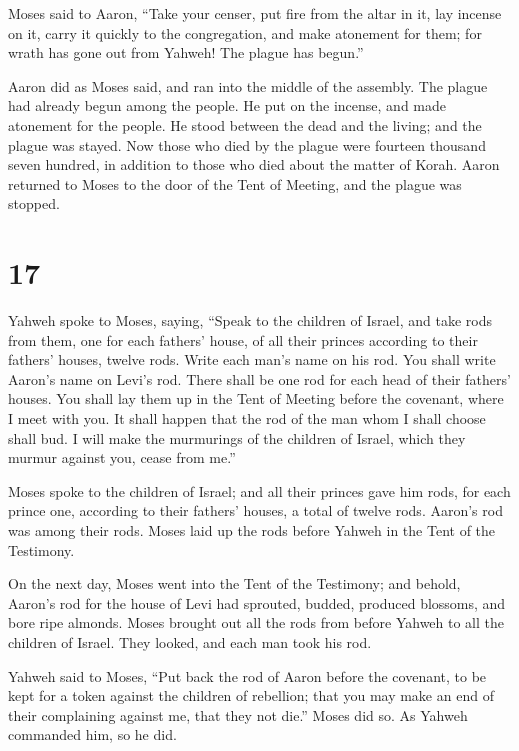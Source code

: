  Moses said to Aaron, ``Take your censer, put fire from
the altar in it, lay incense on it, carry it quickly to the
congregation, and make atonement for them; for wrath has gone out from
Yahweh! The plague has begun.''

 Aaron did as Moses said, and ran into the middle of the
assembly. The plague had already begun among the people. He put on the
incense, and made atonement for the people.  He stood
between the dead and the living; and the plague was stayed.
 Now those who died by the plague were fourteen thousand
seven hundred, in addition to those who died about the matter of Korah.
 Aaron returned to Moses to the door of the Tent of
Meeting, and the plague was stopped.

\hypertarget{section-16}{%
\section{17}\label{section-16}}

 Yahweh spoke to Moses, saying,  ``Speak to
the children of Israel, and take rods from them, one for each fathers'
house, of all their princes according to their fathers' houses, twelve
rods. Write each man's name on his rod.  You shall write
Aaron's name on Levi's rod. There shall be one rod for each head of
their fathers' houses.  You shall lay them up in the Tent
of Meeting before the covenant, where I meet with you.  It
shall happen that the rod of the man whom I shall choose shall bud. I
will make the murmurings of the children of Israel, which they murmur
against you, cease from me.''

 Moses spoke to the children of Israel; and all their
princes gave him rods, for each prince one, according to their fathers'
houses, a total of twelve rods. Aaron's rod was among their rods.
 Moses laid up the rods before Yahweh in the Tent of the
Testimony.

 On the next day, Moses went into the Tent of the
Testimony; and behold, Aaron's rod for the house of Levi had sprouted,
budded, produced blossoms, and bore ripe almonds.  Moses
brought out all the rods from before Yahweh to all the children of
Israel. They looked, and each man took his rod.

 Yahweh said to Moses, ``Put back the rod of Aaron before
the covenant, to be kept for a token against the children of rebellion;
that you may make an end of their complaining against me, that they not
die.''  Moses did so. As Yahweh commanded him, so he did.

